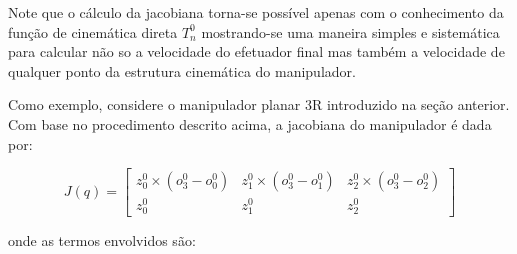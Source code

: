 Note que o cálculo da jacobiana torna-se possível apenas com o conhecimento da
função de cinemática direta \(T_n^0\) mostrando-se uma maneira simples e
sistemática para calcular não so a velocidade do efetuador final mas também a
velocidade de qualquer ponto da estrutura cinemática do manipulador.

Como exemplo, considere o manipulador planar 3R introduzido na seção anterior.
Com base no procedimento descrito acima, a jacobiana do manipulador é dada por:

\begin{equation}
    J(q) = \begin{bmatrix}
        z_0^0 \times (o_3^0 - o_0^0) & z_1^0 \times (o_3^0 - o_1^0) & z_2^0 \times (o_3^0 - o_2^0) \\
        z_0^0                        & z_1^0                        & z_2^0
    \end{bmatrix}
\end{equation}

onde as termos envolvidos são:

